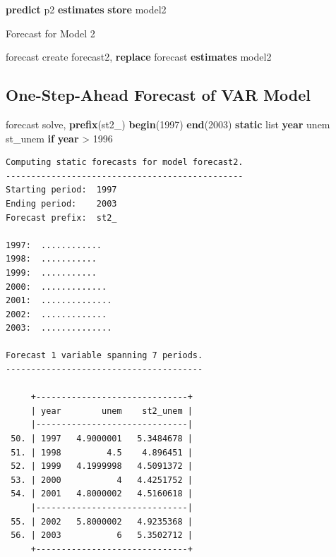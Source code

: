 \documentclass[
]{book}
\newenvironment{Shaded}{\begin{snugshade}}{\end{snugshade}}
\newcommand{\FunctionTok}[1]{\textcolor[rgb]{0.13,0.29,0.53}{\textbf{#1}}}
\newcommand{\KeywordTok}[1]{\textcolor[rgb]{0.13,0.29,0.53}{\textbf{#1}}}
\newcommand{\NormalTok}[1]{#1}
\newcommand{\OtherTok}[1]{\textcolor[rgb]{0.56,0.35,0.01}{#1}}
\begin{document}
\begin{Shaded}
\begin{Highlighting}[]
\KeywordTok{predict}\NormalTok{ p2}
\KeywordTok{estimates} \KeywordTok{store}\NormalTok{ model2}
\end{Highlighting}
\end{Shaded}

Forecast for Model 2

\begin{Shaded}
\begin{Highlighting}[]
\NormalTok{forecast create forecast2, }\KeywordTok{replace}
\NormalTok{forecast }\KeywordTok{estimates}\NormalTok{ model2}
\end{Highlighting}
\end{Shaded}

\subsection*{One-Step-Ahead Forecast of VAR Model}\label{one-step-ahead-forecast-of-var-model}

\begin{Shaded}
\begin{Highlighting}[]
\NormalTok{forecast solve, }\KeywordTok{prefix}\NormalTok{(st2\_) }\KeywordTok{begin}\NormalTok{(1997) }\KeywordTok{end}\NormalTok{(2003) }\KeywordTok{static}
\OtherTok{list} \FunctionTok{year}\NormalTok{ unem st\_unem }\KeywordTok{if} \FunctionTok{year}\NormalTok{ \textgreater{} 1996}
\end{Highlighting}
\end{Shaded}

\begin{verbatim}
Computing static forecasts for model forecast2.
-----------------------------------------------
Starting period:  1997
Ending period:    2003
Forecast prefix:  st2_

1997:  ............
1998:  ...........
1999:  ...........
2000:  .............
2001:  ..............
2002:  .............
2003:  ..............

Forecast 1 variable spanning 7 periods.
---------------------------------------

     +------------------------------+
     | year        unem    st2_unem |
     |------------------------------|
 50. | 1997   4.9000001   5.3484678 |
 51. | 1998         4.5    4.896451 |
 52. | 1999   4.1999998   4.5091372 |
 53. | 2000           4   4.4251752 |
 54. | 2001   4.8000002   4.5160618 |
     |------------------------------|
 55. | 2002   5.8000002   4.9235368 |
 56. | 2003           6   5.3502712 |
     +------------------------------+
\end{verbatim}
\end{document}

